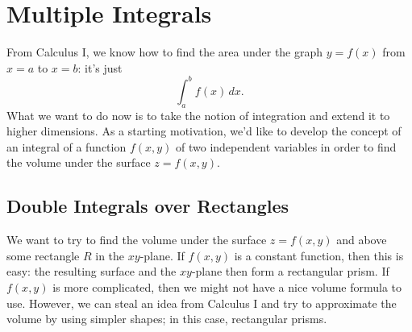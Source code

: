 \documentclass[10pt,]{book}
\theoremstyle{ptxplainnotitle}
\theoremstyle{ptxplaintitle}
\theoremstyle{ptxplainnotitle}
\theoremstyle{ptxplaintitle}
\theoremstyle{ptxplainnotitle}
\theoremstyle{ptxplaintitle}
\theoremstyle{ptxdefinitionnotitle}
\theoremstyle{ptxdefinitiontitle}
\theoremstyle{ptxdefinitionnotitle}
\theoremstyle{ptxdefinitiontitle}
\theoremstyle{ptxdefinitionnotitle}
\theoremstyle{ptxdefinitiontitle}
\theoremstyle{ptxdefinitionnotitle}
\theoremstyle{ptxdefinitiontitle}
\theoremstyle{ptxdefinitionnotitle}
\theoremstyle{ptxdefinitiontitle}
\numberwithin{equation}{section}
\begin{document}
\chapter[{Multiple Integrals}]{Multiple Integrals}\label{multiple-integrals}
\hypertarget{p-1113}{}%
From Calculus I, we know how to find the area under the graph \(y = f(x)\) from \(x = a\) to \(x = b\): it's just%
\begin{equation*}
\int_{a}^{b}f(x)\,dx.
\end{equation*}
What we want to do now is to take the notion of integration and extend it to higher dimensions. As a starting motivation, we'd like to develop the concept of an integral of a function \(f(x,y)\) of two independent variables in order to find the volume under the surface \(z = f(x,y)\).%
\typeout{************************************************}
\typeout{************************************************}
\section[{Double Integrals over Rectangles}]{Double Integrals over Rectangles}\label{section-double-integrals-over-rectangles}
\hypertarget{p-1114}{}%
We want to try to find the volume under the surface \(z = f(x,y)\) and above some rectangle \(R\) in the \(xy\)-plane. If \(f(x,y)\) is a constant function, then this is easy: the resulting surface and the \(xy\)-plane then form a rectangular prism. If \(f(x,y)\) is more complicated, then we might not have a nice volume formula to use. However, we can steal an idea from Calculus I and try to approximate the volume by using simpler shapes; in this case, rectangular prisms.%
\typeout{************************************************}
\typeout{************************************************}
\end{document}
